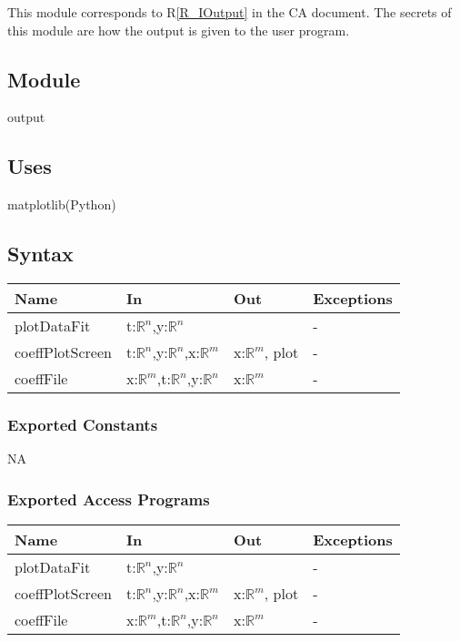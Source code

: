 \documentclass[12pt, titlepage]{article}
\begin{document}
This module corresponds to R\ref{R_IOutput} in the CA document. The secrets of 
this module are how the output is given to the user program.

\subsection{Module}

output

\subsection{Uses}

matplotlib(Python)

\subsection{Syntax}

\begin{tabular}{p{3cm} p{3cm} p{4cm} >{\raggedright\arraybackslash}p{5cm}}
	\toprule
	\textbf{Name} & \textbf{In} & \textbf{Out} & \textbf{Exceptions} \\
	\midrule
	
	plotDataFit & t:$\mathbb{R}^n$,y:$\mathbb{R}^n$ &  & -  \\
	
	coeffPlotScreen & t:$\mathbb{R}^n$,y:$\mathbb{R}^n$,x:$\mathbb{R}^m$ & 
	x:$\mathbb{R}^m$, plot &  -\\
	
	coeffFile& x:$\mathbb{R}^m$,t:$\mathbb{R}^n$,y:$\mathbb{R}^n$ & 
	x:$\mathbb{R}^m$
	& - \\
	
	\bottomrule
\end{tabular}


\subsubsection{Exported Constants}
NA

\subsubsection{Exported Access Programs}
\begin{tabular}{p{3cm} p{3cm} p{4cm} >{\raggedright\arraybackslash}p{5cm}}
	\toprule
	\textbf{Name} & \textbf{In} & \textbf{Out} & \textbf{Exceptions} \\
	\midrule
	
	plotDataFit & t:$\mathbb{R}^n$,y:$\mathbb{R}^n$ &  & -  \\
	
	coeffPlotScreen & t:$\mathbb{R}^n$,y:$\mathbb{R}^n$,x:$\mathbb{R}^m$ & 
	x:$\mathbb{R}^m$, plot &  -\\
	
	coeffFile& x:$\mathbb{R}^m$,t:$\mathbb{R}^n$,y:$\mathbb{R}^n$ & 
	x:$\mathbb{R}^m$
	& - \\
		
	\bottomrule
\end{tabular}
\end{document}
